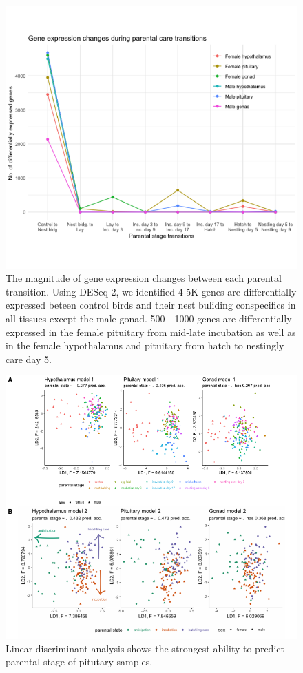 \documentclass[10pt,letterpaper]{article}
\begin{document}
\begin{figure}
\centering
\includegraphics{characterization_manuscript_files/figure-latex/unnamed-chunk-4-1.pdf}
\caption{The magnitude of gene expression changes between each parental
transition. Using DESeq 2, we identified 4-5K genes are differentially
expressed beteen control birds and their nest buliding conspecifics in
all tissues except the male gonad. 500 - 1000 genes are differentially
expressed in the female pituitary from mid-late incubation as well as in
the female hypothalamus and pituitary from hatch to nestingly care day
5.}
\end{figure}

\begin{figure}
\centering
\includegraphics{characterization_manuscript_files/figure-latex/unnamed-chunk-5-1.pdf}
\caption{Linear discriminant analysis shows the strongest ability to
predict parental stage of pitutary samples.}
\end{figure}
\end{document}
